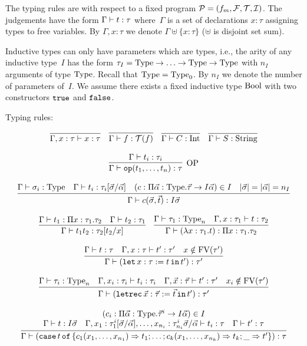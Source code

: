 \documentclass[
    9pt,            %
    techreport,        %
    affiltop,       %
]{art}
\begin{document}
The typing rules are with respect to a fixed \JuvixCore{} program $\mathcal{P} = (f_m, \mathcal{F}, \mathcal{T}, \mathcal{I})$. The judgements have the form $\Gamma \vdash t : \tau$ where~$\Gamma$ is a set of declarations $x : \tau$ assigning types to free variables. By $\Gamma, x : \tau$ we denote $\Gamma \uplus \{x : \tau\}$ ($\uplus$ is disjoint set sum).

Inductive types can only have parameters which are types, i.e., the arity of any inductive type~$I$ has the form $\tau_I = \mathrm{Type} \to \ldots \to \mathrm{Type} \to \mathrm{Type}$ with $n_I$ arguments of type $\mathrm{Type}$. Recall that $\mathrm{Type} = \mathrm{Type}_0$. By $n_I$ we denote the number of parameters of~$I$. We assume there exists a fixed inductive type $\mathrm{Bool}$ with two constructors $\mathtt{true}$ and $\mathtt{false}$.

Typing rules:

\[
\begin{array}{c}
\infer{\Gamma, x : \tau \proves x : \tau}{}\quad
\infer{\Gamma \proves f : \Tc(f)}{}\quad
\infer{\Gamma \proves C : \Int}{}\quad
\infer{\Gamma \proves S : \String}{}
\\ \\
\infer[\mathrm{OP}]{\Gamma \proves \op(t_1,\ldots,t_n) : \tau}{\Gamma \proves t_i : \tau_i}
\\ \\
\infer{\Gamma \proves c(\vec{\sigma},\vec{t}) : I \vec{\sigma}}{\Gamma \proves \sigma_i : \Type & \Gamma \proves t_i : \tau_i[\vec{\sigma}/\vec{\alpha}] & (c : \Pi \vec{\alpha} : \Type . \vec{\tau} \to I \vec{\alpha}) \in I & |\vec{\sigma}| = |\vec{\alpha}| = n_I}
\\ \\
\infer{\Gamma \proves t_1 t_2 : \tau_2[t_2/x]}{\Gamma \proves t_1 : \Pi x : \tau_1 . \tau_2 & \Gamma \proves t_2 : \tau_1}\quad
\infer{\Gamma \proves (\lambda x : \tau_1 . t) : \Pi x : \tau_1 . \tau_2}{\Gamma \proves \tau_1 : \Type_n & \Gamma, x : \tau_1 \proves t : \tau_2}
\\ \\
\infer{\Gamma \proves (\slet{x : \tau := t}{t'}) : \tau'}{\Gamma \proves t : \tau & \Gamma, x : \tau \proves t' : \tau' & x \notin \FV(\tau')}
\\ \\
\infer{\Gamma \proves (\sletrec{\vec{x} : \vec{\tau} := \vec{t}}{t'}) : \tau'}{\Gamma \proves \tau_i : \Type_n & \Gamma, x_i : \tau_i \proves t_i : \tau_i & \Gamma, \vec{x} : \vec{\tau} \proves t' : \tau' & x_i \notin \FV(\tau')}
\\ \\
\infer{\Gamma \proves (\scase{t}{\{c_1(x_1,\ldots,x_{n_1}) \To t_1; \ldots; c_k(x_1,\ldots,x_{n_k}) \To t_k; \_ \To t'\}}) : \tau}{\multicolumn{3}{c}{(c_i : \Pi \vec{\alpha} : \Type . \vec{\tau}^i \to I\vec{\alpha}) \in I}\\ \Gamma \proves t : I \vec{\sigma} & \Gamma, x_1 : \tau_1^i[\vec{\sigma}/\vec{\alpha}], \ldots, x_{n_i} : \tau_{n_i}^i\vec{\sigma}/\vec{\alpha} \proves t_i : \tau & \Gamma \proves t' : \tau}

\end{array}\]
\end{document}
